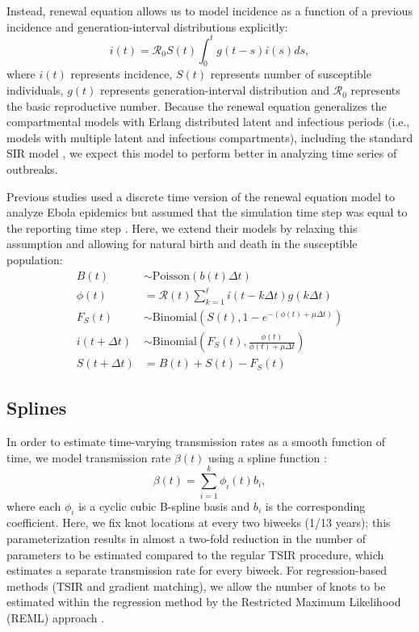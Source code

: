 \documentclass{article}
\begin{document}
Instead, renewal equation allows us to model incidence as a function of a previous incidence and generation-interval distributions explicitly:
\begin{equation}
i(t) = \mathcal R_0 S(t) \int_0^t g(t-s) i(s) ds,
\end{equation}
where $i(t)$ represents incidence, $S(t)$ represents number of susceptible individuals, $g(t)$ represents generation-interval distribution and $\mathcal R_0$ represents the basic reproductive number.
Because the renewal equation generalizes the compartmental models with Erlang distributed latent and infectious periods (i.e., models with multiple latent and infectious compartments), including the standard SIR model \citep{champredon2018equivalence}, we expect this model to perform better in analyzing time series of outbreaks.

Previous studies used a discrete time version of the renewal equation model to analyze Ebola epidemics but assumed that the simulation time step was equal to the reporting time step \citep{li2018fitting, champredon2018two}.
Here, we extend their models by relaxing this assumption and allowing for natural birth and death in the susceptible population:
\begin{equation}
\begin{aligned}
B(t) &\sim \mathrm{Poisson}(b(t) \Delta t)\\
\phi(t) &= \mathcal R(t) \sum_{k=1}^\ell i(t - k \Delta t) g(k \Delta t)\\
F_{S}(t) &\sim \mathrm{Binomial}\left(S(t), 1 - e^{-(\phi(t) + \mu \Delta t)} \right)\\
i(t + \Delta t) &\sim \mathrm{Binomial}\left(F_{S}(t), \frac{\phi(t)}{\phi(t) + \mu \Delta t} \right)\\
S(t + \Delta t) &= B(t) + S(t) - F_{S}(t)
\end{aligned}
\end{equation}



\subsection{Splines}

In order to estimate time-varying transmission rates as a smooth function of time, we model transmission rate $\beta(t)$ using a spline function \citep{hooker2010parameterizing}:
\begin{equation}
\beta(t) = \sum_{i=1}^k \phi_i(t) b_i,
\end{equation}
where each $\phi_i$ is a cyclic cubic B-spline basis and $b_i$ is the corresponding coefficient.
Here, we fix knot locations at every two biweeks (1/13 years);
this parameterization results in almost a two-fold reduction in the number of parameters to be estimated compared to the regular TSIR procedure, which estimates a separate transmission rate for every biweek.
For regression-based methods (TSIR and gradient matching), we allow the number of knots to be estimated within the regression method by the Restricted Maximum Likelihood (REML) approach \citep{wood2012mgcv}.
\end{document}
